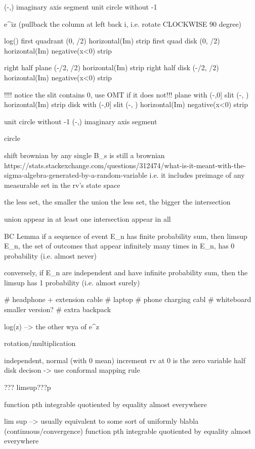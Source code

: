 (-\pi,\pi) imaginary axis segment						unit circle without -1

e^{iz} (pullback the column at left back i, i.e. rotate CLOCKWISE 90 degree)



									log()
first quadrant		(0, \pi/2) horizontal(Im) strip										
first quad disk		(0, \pi/2) horizontal(Im) negative(x<0) strip 			
	
right half plane 	(-\pi/2, \pi/2) horizontal(Im) strip
right half disk		(-\pi/2, \pi/2) horizontal(Im) negative(x<0) strip

!!!! notice the slit contains 0, use OMT if it does not!!!
plane with (-\infty,0] slit		(-\pi, \pi) horizontal(Im) strip
disk with (-\infty,0] slit		(-\pi, \pi) horizontal(Im) negative(x<0) strip

unit circle without -1			(-\pi,\pi) imaginary axis segment


circle



shift brownian by any single B_s is still a brownian
https://stats.stackexchange.com/questions/312474/what-is-it-meant-with-the-sigma-algebra-generated-by-a-random-variable
i.e. it includes preimage of any measurable set in the rv's state space

the less set, the smaller the union
the less set, the bigger the intersection

union appear in at least one
intersection appear in all





BC Lemma
if a sequence of event E_n has finite probability sum, then limsup E_n, the set of  outcomes that appear infinitely many times in E_n, has 0 probability (i.e. almost never)

conversely, if E_n are independent and have infinite probability sum, then the limsup has 1 probability (i.e. almost surely)

# headphone + extension cable
# laptop
# phone charging cabl
# whiteboard smaller version?
# extra backpack


log(z) --> the other wya of e^z

rotation/multiplication





		
independent, normal (with 0 mean) increment 
rv at 0 is the zero variable
	half disk decison -> use conformal mapping rule


??? limsup???p
 
function pth integrable quotiented by equality almost everywhere

lim sup --> usually equivalent to some sort of uniformly blabla (continuous/convergence)
function pth integrable quotiented by equality almost everywhere


